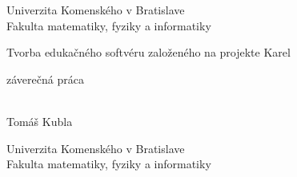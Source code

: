 \documentclass[12pt, oneside]{book}
\def\mfyear{2015}
\def\mftitle{Tvorba edukačného softvéru založeného na projekte Karel}
\def\mfthesistype{záverečná práca}
\def\mfauthor{Tomáš Kubla}
\begin{document}
     

\thispagestyle{empty}
\noindent

\begin{minipage}{0.95\textwidth}
\begin{center}
\sc  
\large
\vspace*{0.3cm} Univerzita Komenského v Bratislave\\
\vspace*{0.3cm} Fakulta matematiky, fyziky a informatiky\\
\end{center}
\end{minipage}

\vfill

\begin{minipage}{1.1\textwidth}
\begin{flushright}
\bigskip\bigskip
\begin{center}
\sc\LARGE\mftitle
\end{center}
\bigskip
\centerline{\sc\mfthesistype}

\bigskip\bigskip\bigskip\bigskip
\end{flushright}
\end{minipage}
\vfill

\noindent \mfyear\\
\indent\mfauthor

\eject %


\thispagestyle{empty}
\noindent

\begin{minipage}{0.95\textwidth}
\begin{center}
\sc  
\large
\vspace*{0.3cm} Univerzita Komenského v Bratislave\\
\vspace*{0.3cm} Fakulta matematiky, fyziky a informatiky\\
\end{center}
\end{minipage}

\vfill
\end{document}
